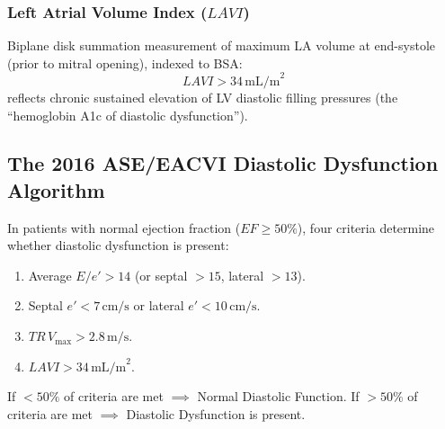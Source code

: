 \documentclass[11pt,a4paper]{article}
\begin{document}
\subsubsection{Left Atrial Volume Index (\texorpdfstring{$LAVI$}{LAVI})}
Biplane disk summation measurement of maximum LA volume at end-systole (prior to mitral opening), indexed to BSA:
\begin{equation}
    LAVI > 34\,\text{mL/m}^2
\end{equation}
reflects chronic sustained elevation of LV diastolic filling pressures (the ``hemoglobin A1c of diastolic dysfunction'').

\subsection{The 2016 ASE/EACVI Diastolic Dysfunction Algorithm}

In patients with normal ejection fraction ($EF \ge 50\%$), four criteria determine whether diastolic dysfunction is present:
\begin{enumerate}[leftmargin=*]
    \item Average $E/e' > 14$ (or septal $> 15$, lateral $> 13$).
    \item Septal $e' < 7\,\text{cm/s}$ or lateral $e' < 10\,\text{cm/s}$.
    \item $TR\,V_{\text{max}} > 2.8\,\text{m/s}$.
    \item $LAVI > 34\,\text{mL/m}^2$.
\end{enumerate}
If $< 50\%$ of criteria are met $\implies$ Normal Diastolic Function. If $> 50\%$ of criteria are met $\implies$ Diastolic Dysfunction is present.
\end{document}
